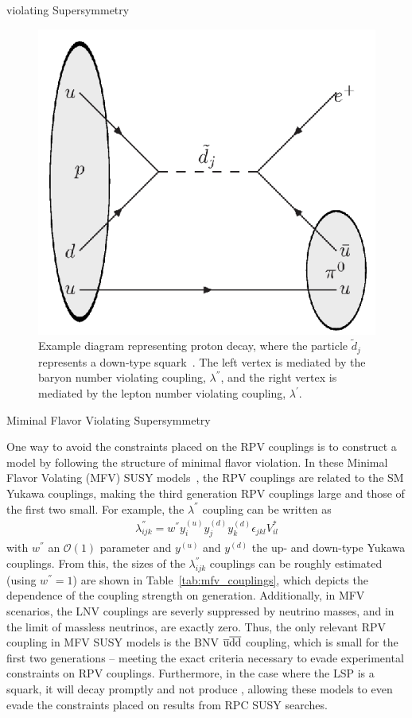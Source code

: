 \begin{section}{\RP violating Supersymmetry}
\begin{figure}[tbp!]
\begin{center}
\includegraphics[angle=0,width=0.40\columnwidth]{fig/proton_decay.png}
\end{center}
\caption{Example diagram representing proton decay, where the particle $\tilde{d}_j$ represents a down-type squark~\cite{Allanach:2016yth}.
The left vertex is mediated by the baryon number violating coupling, $\lambda^{''}$, and the right vertex is mediated by the lepton number violating coupling, $\lambda^{'}$.}
\label{fig:proton_decay}
\end{figure}

\begin{subsection}{Miminal Flavor Violating Supersymmetry}

One way to avoid the constraints placed on the RPV couplings is to construct a model by following the structure of minimal flavor violation.
In these Minimal Flavor Volating (MFV) SUSY models~\cite{Csaki:2013we,Krnjaic:2012aj,Csaki:2011ge}, the RPV couplings are related to the SM Yukawa couplings, making the third generation RPV couplings large and those of the first two small.
For example, the $\lambda^{''}$ coupling can be written as
\begin{align}
\lambda^{''}_{ijk} = w^{''} y^{(u)}_i y^{(d)}_j y^{(d)}_k \epsilon_{jkl} V^{*}_{il}
\end{align}
with $w^{''}$ an $\mathcal{O}(1)$ parameter and $y^{(u)}$ and $y^{(d)}$ the up- and down-type Yukawa couplings.
From this, the sizes of the $\lambda^{''}_{ijk}$ couplings can be roughly estimated (using $w^{''} = 1$) are shown in Table~\ref{tab:mfv_couplings}, which depicts the dependence of the coupling strength on generation.
Additionally, in MFV scenarios, the LNV couplings are severly suppressed by neutrino masses, and in the limit of massless neutrinos, are exactly zero.
Thus, the only relevant RPV coupling in MFV SUSY models is the BNV $\overline{\mathrm{u}}\overline{\mathrm{d}}\overline{\mathrm{d}}$ coupling, which is small for the first two generations -- meeting the exact criteria necessary to evade experimental constraints on RPV couplings.
Furthermore, in the case where the LSP is a squark, it will decay promptly and not produce \MET, allowing these models to even evade the constraints placed on results from RPC SUSY searches.


\end{subsection}
\end{section}
